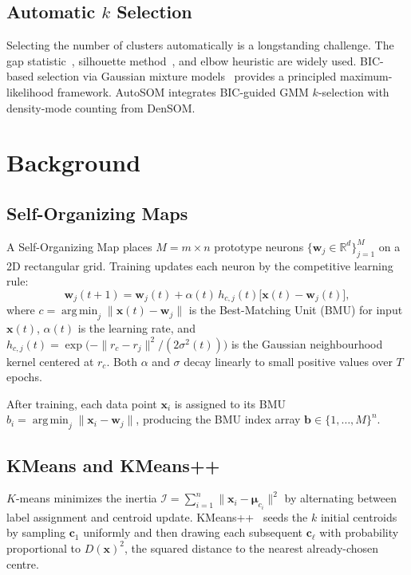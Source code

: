\documentclass[journal]{IEEEtran}
\DeclareMathOperator*{\argmin}{arg\,min}
\begin{document}
\subsection{Automatic $k$ Selection}

Selecting the number of clusters automatically is a longstanding challenge. The gap statistic~\cite{tibshirani2001estimating}, silhouette method~\cite{rousseeuw1987silhouettes}, and elbow heuristic are widely used. BIC-based selection via Gaussian mixture models~\cite{schwarz1978estimating,fraley2002model} provides a principled maximum-likelihood framework. AutoSOM integrates BIC-guided GMM $k$-selection with density-mode counting from DenSOM.

\section{Background}
\label{sec:background}

\subsection{Self-Organizing Maps}

A Self-Organizing Map places $M = m \times n$ prototype neurons $\{\mathbf{w}_j \in \mathbb{R}^d\}_{j=1}^{M}$ on a 2D rectangular grid. Training updates each neuron by the competitive learning rule:
\begin{equation}
  \mathbf{w}_j(t+1) = \mathbf{w}_j(t) + \alpha(t)\,h_{c,j}(t)\bigl[\mathbf{x}(t) - \mathbf{w}_j(t)\bigr],
  \label{eq:som_update}
\end{equation}
where $c = \argmin_j \|\mathbf{x}(t) - \mathbf{w}_j\|$ is the Best-Matching Unit (BMU) for input $\mathbf{x}(t)$, $\alpha(t)$ is the learning rate, and $h_{c,j}(t) = \exp\!\bigl(-\|r_c - r_j\|^2/(2\sigma^2(t))\bigr)$ is the Gaussian neighbourhood kernel centered at $r_c$. Both $\alpha$ and $\sigma$ decay linearly to small positive values over $T$ epochs.

After training, each data point $\mathbf{x}_i$ is assigned to its BMU $b_i = \argmin_j \|\mathbf{x}_i - \mathbf{w}_j\|$, producing the BMU index array $\mathbf{b} \in \{1,\ldots,M\}^n$.

\subsection{KMeans and KMeans++}

$K$-means minimizes the inertia $\mathcal{I} = \sum_{i=1}^n \|\mathbf{x}_i - \boldsymbol{\mu}_{c_i}\|^2$ by alternating between label assignment and centroid update. KMeans++~\cite{arthur2007kmeans} seeds the $k$ initial centroids by sampling $\mathbf{c}_1$ uniformly and then drawing each subsequent $\mathbf{c}_\ell$ with probability proportional to $D(\mathbf{x})^2$, the squared distance to the nearest already-chosen centre.
\end{document}
